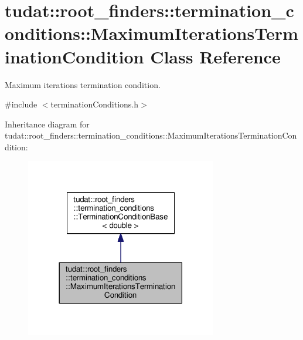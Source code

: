 \hypertarget{classtudat_1_1root__finders_1_1termination__conditions_1_1MaximumIterationsTerminationCondition}{}\section{tudat\+:\+:root\+\_\+finders\+:\+:termination\+\_\+conditions\+:\+:Maximum\+Iterations\+Termination\+Condition Class Reference}
\label{classtudat_1_1root__finders_1_1termination__conditions_1_1MaximumIterationsTerminationCondition}


Maximum iterations termination condition.  




{\ttfamily \#include $<$termination\+Conditions.\+h$>$}



Inheritance diagram for tudat\+:\+:root\+\_\+finders\+:\+:termination\+\_\+conditions\+:\+:Maximum\+Iterations\+Termination\+Condition\+:
\nopagebreak
\begin{figure}[H]
\begin{center}
\leavevmode
\includegraphics[width=237pt]{classtudat_1_1root__finders_1_1termination__conditions_1_1MaximumIterationsTerminationCondition__inherit__graph}
\end{center}
\end{figure}


